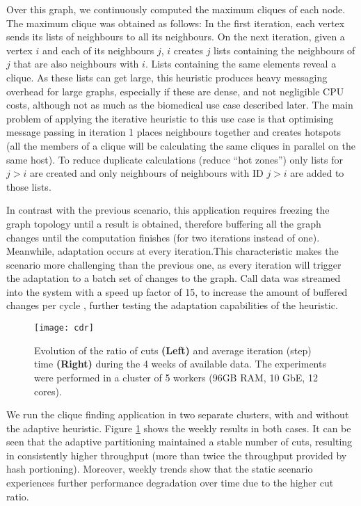 \documentclass{sig-alternate-10pt}
\begin{document}
Over this graph, we continuously computed the maximum cliques of each node. The maximum clique was obtained as follows: In the first iteration, each vertex sends its lists of neighbours to all its neighbours. On the next iteration, given a vertex $i$ and each of its neighbours $j$, $i$ creates $j$ lists containing the neighbours of $j$ that are also neighbours with $i$. Lists containing the same elements reveal a clique. As these lists can get large, this heuristic produces heavy messaging overhead for large graphs, especially if these are dense, and not negligible CPU costs, although not as much as the biomedical use case described later. The main problem of applying the iterative heuristic to this use case is that optimising message passing in iteration 1 places neighbours together and creates hotspots (all the members of a clique will be calculating the same cliques in parallel on the same host). To reduce duplicate calculations (reduce ``hot zones'') only lists for $j>i$ are created and only neighbours of neighbours with ID $j>i$ are added to those lists.
 
In contrast with the previous scenario, this application requires freezing the graph topology until a result is obtained, therefore  buffering all the graph changes until the computation finishes (for two iterations instead of one). Meanwhile, adaptation occurs at every iteration.This characteristic makes the scenario more challenging than the previous one, as every iteration will trigger the adaptation to a batch set of changes to the graph. Call data was streamed into the system with a speed up factor of 15, to increase the amount of buffered changes per cycle , further testing the adaptation capabilities of the heuristic. 

\begin{figure}[t]
\centering
\texttt{[image: cdr]}

\caption{Evolution of the ratio of cuts \textbf{(Left)} and average iteration (step) time \textbf{(Right)} during the 4 weeks of available data. The experiments were performed in a cluster of 5 workers (96GB RAM, 10 GbE, 12 cores).}
\vspace{-15pt}
\label{fig:phonePerf}
\end{figure}


We run the clique finding application in two separate clusters, with and without the adaptive heuristic.  Figure \ref{fig:phonePerf} shows the weekly results in both cases. It can be seen that the adaptive partitioning maintained a stable number of cuts, resulting in consistently higher throughput (more than twice the throughput provided by hash portioning). Moreover, weekly trends show that the static scenario experiences further performance degradation over time due to the higher cut ratio. 
\end{document}
